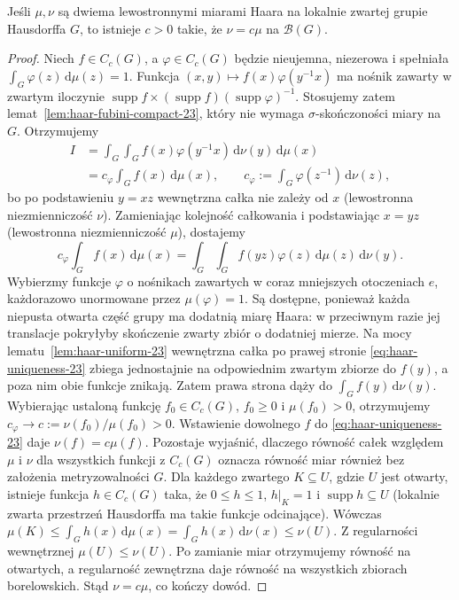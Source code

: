 \begin{twierdzenie}
\label{thm:haar-unique-23}
Jeśli $\mu,\nu$ są dwiema lewostronnymi miarami Haara
na lokalnie zwartej grupie Hausdorffa $G$, to istnieje
$c>0$ takie, że $\nu=c\mu$ na $\mathcal B(G)$.
\end{twierdzenie}
\begin{proof}
Niech $f\in C_c(G)$, a $\varphi\in C_c(G)$ będzie
nieujemna, niezerowa i spełniała
$\int_G\varphi(z)\,\mathrm d\mu(z)=1$.
Funkcja $(x,y)\mapsto f(x)\varphi(y^{-1}x)$
ma nośnik zawarty w zwartym iloczynie
$\operatorname{supp}f\times
(\operatorname{supp}f)(\operatorname{supp}\varphi)^{-1}$.
Stosujemy zatem lemat~\ref{lem:haar-fubini-compact-23},
który nie wymaga $\sigma$-skończoności miary na $G$.
Otrzymujemy
\begin{align*}
 I&=\int_G\!\int_G f(x)\varphi(y^{-1}x)
       \,\mathrm d\nu(y)\,\mathrm d\mu(x)\\
  &=c_\varphi\int_Gf(x)\,\mathrm d\mu(x),\qquad
 c_\varphi:=\int_G\varphi(z^{-1})\,\mathrm d\nu(z),
\end{align*}
bo po podstawieniu $y=xz$ wewnętrzna całka nie
zależy od $x$ (lewostronna niezmienniczość $\nu$).
Zamieniając kolejność całkowania i podstawiając
$x=yz$ (lewostronna niezmienniczość $\mu$), dostajemy
\begin{equation}\label{eq:haar-uniqueness-23}
 c_\varphi\int_G f(x)\,\mathrm d\mu(x)
 =\int_G\!\int_G f(yz)\varphi(z)
       \,\mathrm d\mu(z)\,\mathrm d\nu(y).
\end{equation}
Wybierzmy funkcje $\varphi$ o nośnikach zawartych
w coraz mniejszych otoczeniach $e$, każdorazowo
unormowane przez $\mu(\varphi)=1$. Są dostępne,
ponieważ każda niepusta otwarta część grupy ma
dodatnią miarę Haara: w przeciwnym razie jej
translacje pokryłyby skończenie zwarty zbiór
o dodatniej mierze.
Na mocy lematu~\ref{lem:haar-uniform-23}
wewnętrzna całka po prawej stronie
\eqref{eq:haar-uniqueness-23} zbiega jednostajnie
na odpowiednim zwartym zbiorze do $f(y)$,
a poza nim obie funkcje znikają.
Zatem prawa strona dąży do $\int_Gf(y)\,\mathrm d\nu(y)$.
Wybierając ustaloną funkcję $f_0\in C_c(G)$,
$f_0\ge0$ i $\mu(f_0)>0$, otrzymujemy
$c_\varphi\to c:=\nu(f_0)/\mu(f_0)>0$.
Wstawienie dowolnego $f$ do
\eqref{eq:haar-uniqueness-23} daje
$\nu(f)=c\mu(f)$. Pozostaje wyjaśnić, dlaczego równość całek względem
$\mu$ i $\nu$ dla wszystkich funkcji z $C_c(G)$ oznacza
równość miar również bez założenia metryzowalności $G$.
Dla każdego zwartego $K\subseteq U$, gdzie $U$ jest otwarty,
istnieje funkcja $h\in C_c(G)$ taka, że
$0\le h\le1$, $h|_K=1$ i $\operatorname{supp}h\subseteq U$
(lokalnie zwarta przestrzeń Hausdorffa ma takie funkcje
odcinające). Wówczas $\mu(K)\le\int_Gh(x)\,\mathrm d\mu(x)
=\int_Gh(x)\,\mathrm d\nu(x)\le\nu(U)$. Z regularności
wewnętrznej $\mu(U)\le\nu(U)$. Po zamianie miar
otrzymujemy równość na otwartych, a regularność zewnętrzna
daje równość na wszystkich zbiorach borelowskich.
Stąd $\nu=c\mu$, co kończy dowód.
\end{proof}

